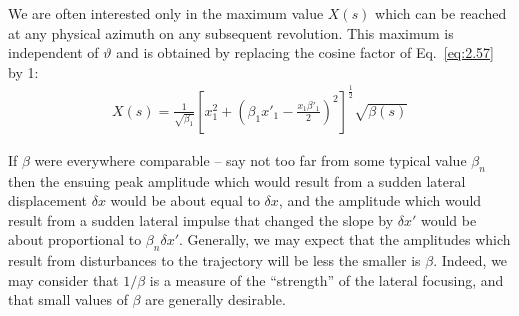 We are often interested only in the maximum value $X(s)$ which can be reached at any physical azimuth on any subsequent revolution. This maximum is independent of $\vartheta$ and is obtained by replacing the cosine factor of Eq.~\eqref{eq:2.57} by 1:
\begin{align}
	X(s) = \frac{1}{\sqrt{\beta_1}}\left[x_1^2+\left(\beta_1x'_1-\frac{x_1\beta'_1}{2}\right)^2\right]^\frac{1}{2}\sqrt{\beta(s)}
\end{align}

If $\beta$ were everywhere comparable -- say not too far from some typical value $\beta_n$ then the ensuing peak amplitude which would result from a sudden lateral displacement $\delta x$ would be about equal to $\delta x$, and the amplitude which would result from a sudden lateral impulse that changed the slope by $\delta x'$ would be about proportional to $\beta_n \delta x'$. Generally, we may expect that the amplitudes which result from disturbances to the trajectory will be less the smaller is $\beta$. Indeed, we may consider that $1/\beta$ is a measure of the “strength” of the lateral focusing, and that small values of $\beta$ are generally desirable.
